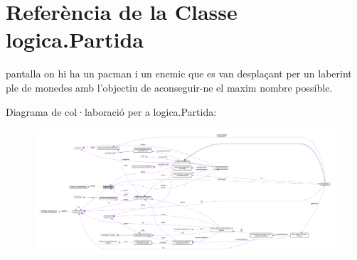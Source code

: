 \hypertarget{classlogica_1_1_partida}{\section{Referència de la Classe logica.\+Partida}
\label{classlogica_1_1_partida}
}


pantalla on hi ha un pacman i un enemic que es van desplaçant per un laberint ple de monedes amb l'objectiu de aconseguir-\/ne el maxim nombre possible.  




Diagrama de col·laboració per a logica.\+Partida\+:
\nopagebreak
\begin{figure}[H]
\begin{center}
\leavevmode
\includegraphics[width=350pt]{classlogica_1_1_partida__coll__graph}
\end{center}
\end{figure}
